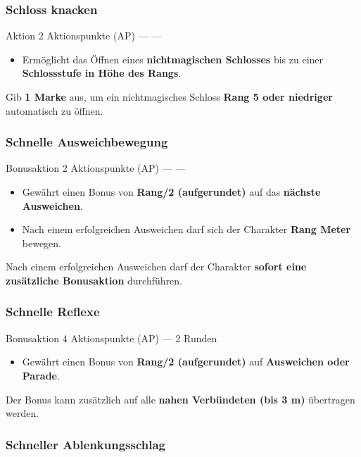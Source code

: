 \subsubsection*{Schloss knacken}

\skillcard
{}
{Aktion}
{2 Aktionspunkte (AP)}
{—}
{—}
{
	\begin{itemize}
		\item Ermöglicht das Öffnen eines \textbf{nichtmagischen Schlosses}
		bis zu einer \textbf{Schlossstufe in Höhe des Rangs}.
	\end{itemize}
}
{
	Gib \textbf{1 Marke} aus, um ein nichtmagisches Schloss
	\textbf{Rang 5 oder niedriger} automatisch zu öffnen.
}


\subsubsection*{Schnelle Ausweichbewegung}

\skillcard
{}
{Bonusaktion}
{2 Aktionspunkte (AP)}
{—}
{—}
{
	\begin{itemize}
		\item Gewährt einen Bonus von \textbf{Rang/2 (aufgerundet)}
		auf das \textbf{nächste Ausweichen}.
		\item Nach einem erfolgreichen Ausweichen darf sich der Charakter
		\textbf{Rang Meter} bewegen.
	\end{itemize}
}
{
	Nach einem erfolgreichen Ausweichen darf der Charakter
	\textbf{sofort eine zusätzliche Bonusaktion} durchführen.
}


\subsubsection*{Schnelle Reflexe}

\skillcard
{}
{Bonusaktion}
{4 Aktionspunkte (AP)}
{—}
{2 Runden}
{
	\begin{itemize}
		\item Gewährt einen Bonus von \textbf{Rang/2 (aufgerundet)}
		auf \textbf{Ausweichen oder Parade}.
	\end{itemize}
}
{
	Der Bonus kann zusätzlich auf alle
	\textbf{nahen Verbündeten (bis 3 m)} übertragen werden.
}


\subsubsection*{Schneller Ablenkungsschlag}

